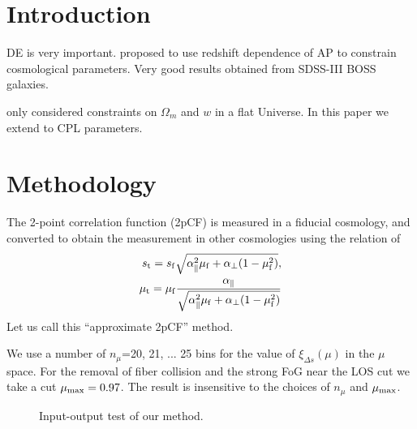 \documentclass[useAMS,usenatbib]{mnras}
\begin{document}

\section{Introduction}


DE is very important. 
\citep{Li2016} proposed to use redshift dependence of AP to constrain cosmological parameters.
Very good results obtained from SDSS-III BOSS galaxies.

\citep{Li2016} only considered constraints on $\Omega_m$ and $w$ in a flat Universe.
In this paper we extend to CPL parameters.




\section{Methodology}

The 2-point correlation function (2pCF) is measured in a fiducial cosmology,
and converted to obtain the measurement in other cosmologies using the relation of 
\begin{eqnarray}
 s_{\rm t} = s_{\rm f} \sqrt{\alpha_{\parallel}^2 \mu_{\rm f}+\alpha_{\bot}(1-\mu_{\rm f}^2)}, \\
 \mu_{\rm t} = \mu_{\rm f} \frac{\alpha_\parallel}
 {\sqrt{\alpha_{\parallel}^2 \mu_{\rm f} +\alpha_{\bot}(1-\mu_{\rm f}^2)}}
\end{eqnarray}
Let us call this ``approximate 2pCF'' method.

We use a number of $n_{\mu}$=20, 21, ... 25 bins for the value of $\xi_{\Delta s}(\mu)$ in the $\mu$ space.
For the removal of fiber collision and the strong FoG near the LOS cut we take a cut $\mu_{\rm max} = 0.97$.
The result is insensitive to the choices of $n_\mu$ and $\mu_{\rm max}$.

\begin{figure}
   \caption{\label{fig_IO}
   Input-output test of our method.
   }
\end{figure}
\end{document}
